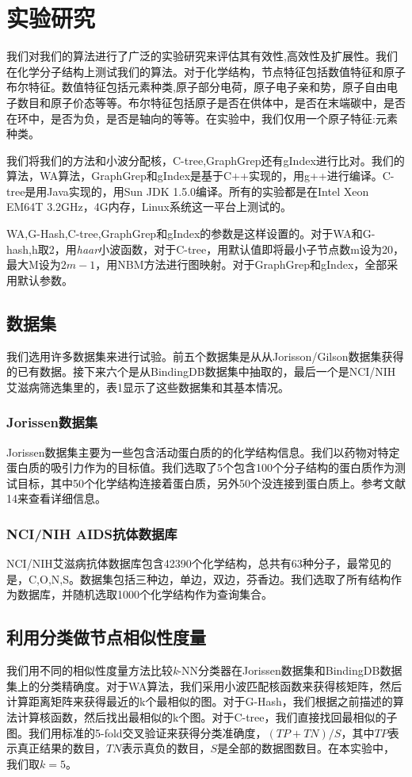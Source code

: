 \documentclass{article}
\begin{document}
\else

\fi
\chapter{实验研究}
我们对我们的算法进行了广泛的实验研究来评估其有效性,高效性及扩展性。我们在化学分子结构上测试我们的算法。对于化学结构，节点特征包括数值特征和原子布尔特征。数值特征包括元素种类,原子部分电荷，原子电子亲和势，原子自由电子数目和原子价态等等。布尔特征包括原子是否在供体中，是否在末端碳中，是否在环中，是否为负，是否是轴向的等等。在实验中，我们仅用一个原子特征:元素种类。

我们将我们的方法和小波分配核，C-tree,GraphGrep还有gIndex进行比对。我们的算法，WA算法，GraphGrep和gIndex是基于C++实现的，用g++进行编译。C-tree是用Java实现的，用Sun JDK 1.5.0编译。所有的实验都是在Intel Xeon EM64T 3.2GHz，4G内存，Linux系统这一平台上测试的。

WA,G-Hash,C-tree,GraphGrep和gIndex的参数是这样设置的。对于WA和G-hash,h取2，用\emph{haar}小波函数，对于C-tree，用默认值即将最小子节点数m设为20，最大M设为$2m-1$，用NBM方法进行图映射。对于GraphGrep和gIndex，全部采用默认参数。

\section{数据集}
我们选用许多数据集来进行试验。前五个数据集是从从Jorisson/Gilson数据集获得的已有数据。接下来六个是从BindingDB数据集中抽取的，最后一个是NCI/NIH 艾滋病筛选集里的，表1显示了这些数据集和其基本情况。
\subsection{Jorissen数据集}
Jorissen数据集主要为一些包含活动蛋白质的的化学结构信息。我们以药物对特定蛋白质的吸引力作为的目标值。我们选取了5个包含100个分子结构的蛋白质作为测试目标，其中50个化学结构连接着蛋白质，另外50个没连接到蛋白质上。参考文献14来查看详细信息。

\subsection{NCI/NIH AIDS抗体数据库}
NCI/NIH艾滋病抗体数据库包含42390个化学结构，总共有63种分子，最常见的是，C,O,N,S。数据集包括三种边，单边，双边，芬香边。我们选取了所有结构作为数据库，并随机选取1000个化学结构作为查询集合。
\section{利用分类做节点相似性度量}
我们用不同的相似性度量方法比较\emph{k}-NN分类器在Jorissen数据集和BindingDB数据集上的分类精确度。对于WA算法，我们采用小波匹配核函数来获得核矩阵，然后计算距离矩阵来获得最近的k个最相似的图。对于G-Hash，我们根据之前描述的算法计算核函数，然后找出最相似的k个图。对于C-tree，我们直接找回最相似的子图。我们用标准的5-fold交叉验证来获得分类准确度，$(TP+TN)/S$，其中$TP$表示真正结果的数目，$TN$表示真负的数目，$S$是全部的数据图数目。在本实验中，我们取$k=5$。
\end{document}
